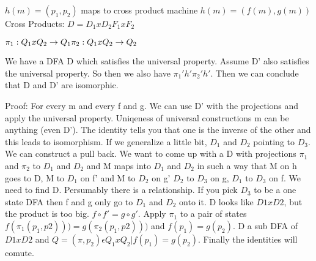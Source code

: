 \documentclass[12pt]{article}
\begin{document}
$h(m)=(p_1,p_2)$  maps to cross product machine
$h(m)=(f(m),g(m))$
Cross Products: 
$D=D_1xD_2
F_1xF_2$

$\pi_1: Q_1 x Q_2 \rightarrow Q_1 \\
\pi_2 : Q_1 x Q_2 \rightarrow Q_2$

\begin{comment}
D in upto a uniqe isomorhpism. There is another construction of a D' that has the exact same property
upto isomorphism  means they are the same upto isomorphism...
\end{comment}

We have a DFA D which satisfies the universal property. Assume D' also satisfies the universal property. So then we also have $\pi_1' h' \pi_2' h'$.
Then we can conclude that D and D' are isomorphic.

Proof: For every m and every f and g. We can use D' with the projections and apply the universal property. Uniqeness of universal constructions
m can be anything (even D'). The identity tells you that one is the inverse of the other and this leads to isomorphism. If we generalize a little bit, $D_1$ and $D_2$ pointing to $D_3$. We can construct a pull back. We want to come up with a D with projections $\pi_1$ and $\pi_2$ to $D_1$ and $D_2$ and M maps into $D_1$ and $D_2$ in such a way that M on h goes to D, M to $D_1$ on f' and M to $D_2$ on g' $D_2$ to $D_3$ on g, $D_1$ to $D_3$ on f. We need to find D. Persumably there is a relationship. If you pick $D_3$ to be a one state DFA then f and g only go to $D_1$ and $D_2$ onto it. D looks like $D1xD2$, but the product is too big. $f \circ f' = g \circ g'$. Apply $\pi_1$ to a pair of states $f(\pi_1(p_1,p2))) = g(\pi_2(p_1,p2)))$ and $f(p_1) = g(p_2)$. D a sub DFA of $D1 x D2$ and $Q = {(\pi, p_2) \epsilon Q_1 x Q_2 | f(p_1) = g(p_2)}$. Finally the identities will comute.
\end{document}

